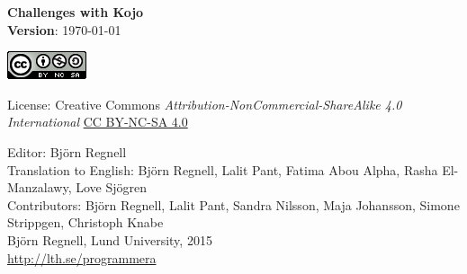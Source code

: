 { \vspace{250mm}\fontsize{11}{11}\flushleft\selectfont 
\vspace*{\fill}

\begin{center}
\Huge {\bf Challenges with Kojo}\\
\Large {\bf Version}: \today{ }
\end{center}
\vskip7cm

\large
\includegraphics{../img/cc.png}

License: Creative Commons {\it Attribution-NonCommercial-ShareAlike 4.0 International} 
\href{http://creativecommons.org/licenses/by-nc-sa/4.0/}{CC BY-NC-SA 4.0}

Editor: Björn Regnell\\
Translation to English: Björn Regnell, Lalit Pant, Fatima Abou Alpha, Rasha El-Manzalawy, Love Sjögren\\
Contributors: Björn Regnell, Lalit Pant, Sandra Nilsson, Maja Johansson, Simone Strippgen, Christoph Knabe\\
\textcopyright{ }Björn Regnell, Lund University, 2015 \\
\url{http://lth.se/programmera}
}